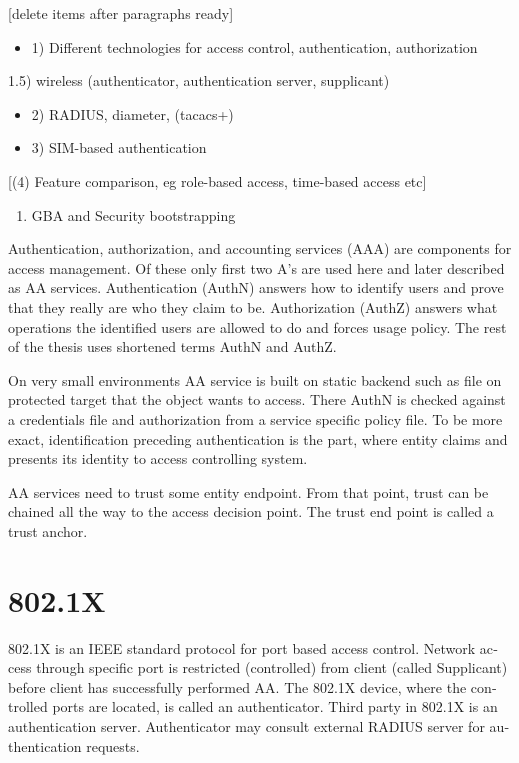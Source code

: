 \documentclass[12pt,a4paper,english]{tutthesis}
\begin{document}
\begin{otherlanguage}{english}
[delete items after paragraphs ready]
\begin{itemize}
\item 1) Different technologies for access control, authentication,
authorization
\end{itemize}
1.5) wireless (authenticator, authentication server, supplicant)
\begin{itemize}
\item 2) RADIUS, diameter, (tacacs+)
\item 3) SIM-based authentication
\end{itemize}
[(4) Feature comparison, eg role-based access, time-based access etc]
\begin{enumerate}
\item GBA and Security bootstrapping
\end{enumerate}

Authentication, authorization, and accounting services (AAA) are
components for access management. Of these only first two A's are used
here and later described as AA services. Authentication (AuthN)
answers how to identify users and prove that they really are
who they claim to be. Authorization (AuthZ) answers what operations
the identified users are allowed to do and forces usage policy. The rest of the thesis uses
shortened terms AuthN and AuthZ.

On very small environments AA service is built on static backend such
as file on protected target that the object wants to access. There AuthN
is checked against a credentials file and authorization from a service
specific policy file. 
To be more exact, identification preceding authentication is the part,
where entity claims and presents its identity to 
access controlling system.

AA services need to trust some entity endpoint. From that point, trust
can be chained all the way to the access decision point. The trust end
point is called a trust anchor.


\section{802.1X}
\label{sec-2-1}

802.1X \cite{8021X} is an IEEE standard protocol for port based access
control.
 Network access through specific port is
restricted (controlled) from client (called Supplicant) before
client has successfully performed AA. The 802.1X device, where the  controlled ports
are located, is called an authenticator. Third party in 802.1X is an
authentication server. Authenticator may consult external RADIUS
server for authentication requests. 



\end{otherlanguage}
\end{document}
